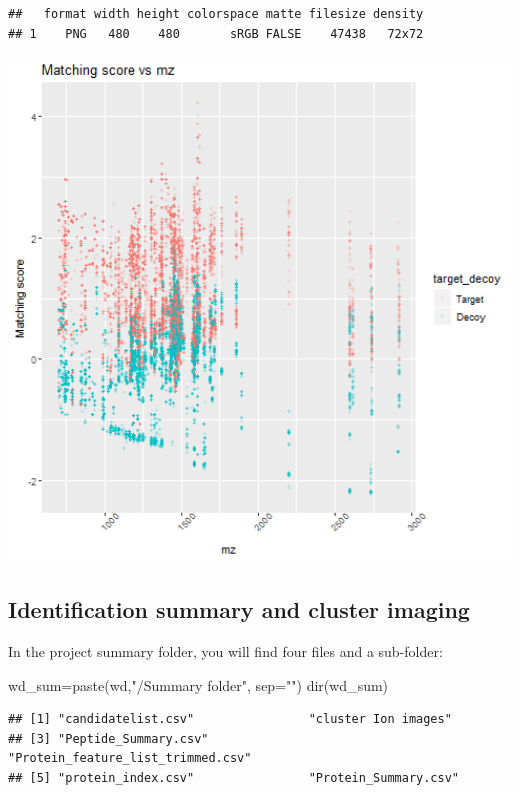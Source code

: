 \documentclass[
]{article}
\newenvironment{Shaded}{\begin{snugshade}}{\end{snugshade}}
\newcommand{\AttributeTok}[1]{\textcolor[rgb]{0.77,0.63,0.00}{#1}}
\newcommand{\FunctionTok}[1]{\textcolor[rgb]{0.00,0.00,0.00}{#1}}
\newcommand{\NormalTok}[1]{#1}
\newcommand{\OtherTok}[1]{\textcolor[rgb]{0.56,0.35,0.01}{#1}}
\newcommand{\StringTok}[1]{\textcolor[rgb]{0.31,0.60,0.02}{#1}}
\begin{document}
\begin{verbatim}
##   format width height colorspace matte filesize density
## 1    PNG   480    480       sRGB FALSE    47438   72x72
\end{verbatim}

\includegraphics[width=6.67in]{README_files/figure-latex/p_Matching_Score_vs_mz plot-1}

\hypertarget{identification-summary-and-cluster-imaging}{%
\subsection{Identification summary and cluster
imaging}\label{identification-summary-and-cluster-imaging}}

In the project summary folder, you will find four files and a
sub-folder:

\begin{Shaded}
\begin{Highlighting}[]
\NormalTok{wd\_sum}\OtherTok{=}\FunctionTok{paste}\NormalTok{(wd,}\StringTok{"/Summary folder"}\NormalTok{, }\AttributeTok{sep=}\StringTok{""}\NormalTok{)}
\FunctionTok{dir}\NormalTok{(wd\_sum)}
\end{Highlighting}
\end{Shaded}

\begin{verbatim}
## [1] "candidatelist.csv"                "cluster Ion images"              
## [3] "Peptide_Summary.csv"              "Protein_feature_list_trimmed.csv"
## [5] "protein_index.csv"                "Protein_Summary.csv"
\end{verbatim}
\end{document}
